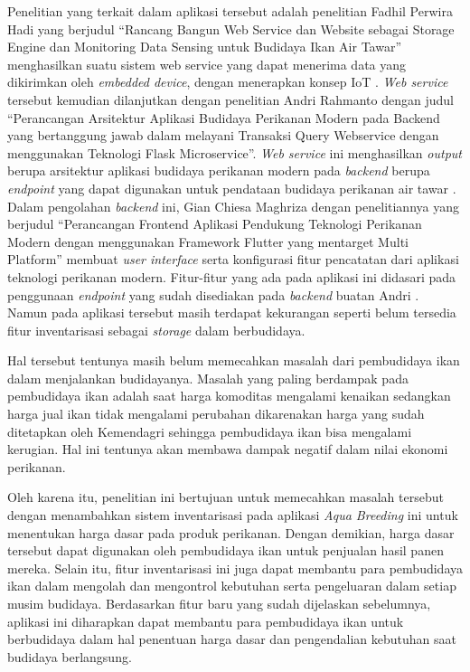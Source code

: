 \begin{spacing}{1.5}
Penelitian yang terkait dalam aplikasi tersebut adalah penelitian Fadhil Perwira Hadi yang berjudul “Rancang Bangun Web Service dan Website sebagai Storage Engine dan Monitoring Data Sensing untuk Budidaya Ikan Air Tawar” menghasilkan suatu sistem web service yang dapat menerima data yang dikirimkan oleh \textit{embedded device}, dengan menerapkan konsep IoT \citep{fadhil2021}. \textit{Web service} tersebut kemudian dilanjutkan dengan penelitian Andri Rahmanto dengan judul “Perancangan Arsitektur Aplikasi Budidaya Perikanan Modern pada Backend yang bertanggung jawab dalam melayani Transaksi Query Webservice dengan menggunakan Teknologi Flask Microservice”. \textit{Web service} ini menghasilkan \textit{output} berupa arsitektur aplikasi budidaya perikanan modern pada \textit{backend} berupa \textit{endpoint} yang dapat digunakan untuk pendataan budidaya perikanan air tawar \citep{andri2022}. Dalam pengolahan \textit{backend} ini, Gian Chiesa Maghriza dengan penelitiannya yang berjudul “Perancangan Frontend Aplikasi Pendukung Teknologi Perikanan Modern dengan menggunakan Framework Flutter yang mentarget Multi Platform” membuat \textit{user interface} serta konfigurasi fitur pencatatan dari aplikasi teknologi perikanan modern. Fitur-fitur yang ada pada aplikasi ini didasari pada penggunaan \textit{endpoint} yang sudah disediakan pada \textit{backend} buatan Andri \citep{gian2022}. Namun pada aplikasi tersebut masih terdapat kekurangan seperti belum tersedia fitur inventarisasi sebagai \textit{storage} dalam berbudidaya.

Hal tersebut tentunya masih belum memecahkan masalah dari pembudidaya ikan dalam menjalankan budidayanya. Masalah yang paling berdampak pada pembudidaya ikan adalah saat harga komoditas mengalami kenaikan sedangkan harga jual ikan tidak mengalami perubahan dikarenakan harga yang sudah ditetapkan oleh Kemendagri sehingga pembudidaya ikan bisa mengalami kerugian. Hal ini tentunya akan membawa dampak negatif dalam nilai ekonomi perikanan.

Oleh karena itu, penelitian ini bertujuan untuk memecahkan masalah tersebut dengan menambahkan sistem inventarisasi pada aplikasi \textit{Aqua Breeding} ini untuk menentukan harga dasar pada produk perikanan. Dengan demikian, harga dasar tersebut dapat digunakan oleh pembudidaya ikan untuk penjualan hasil panen mereka. Selain itu, fitur inventarisasi ini juga dapat membantu para pembudidaya ikan dalam mengolah dan mengontrol kebutuhan serta pengeluaran dalam setiap musim budidaya. Berdasarkan fitur baru yang sudah dijelaskan sebelumnya, aplikasi ini diharapkan dapat membantu para pembudidaya ikan untuk berbudidaya dalam hal penentuan harga dasar dan pengendalian kebutuhan saat budidaya berlangsung. 


\end{spacing}
